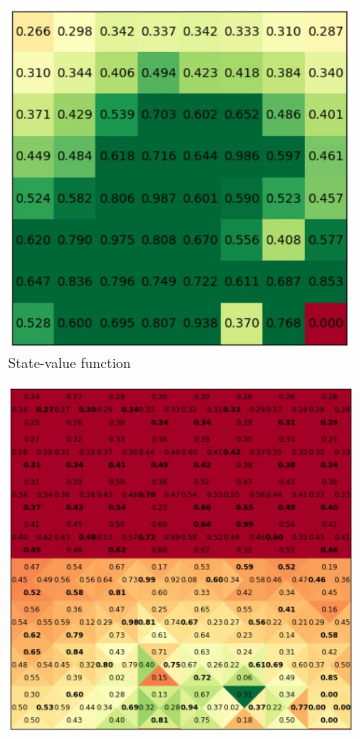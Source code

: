 \documentclass{article}
\begin{document}
\begin{enumerate}
\begin{figure}[H]
\begin{subfigure}[b]{0.5\linewidth}
		\includegraphics[width = \linewidth]{QV3.jpg}
		\caption{State-value function}
	\end{subfigure}
	\begin{subfigure}[b]{0.5\linewidth}
		\includegraphics[width = \linewidth]{QQ3.jpg}

\end{subfigure}
\end{figure}
\end{enumerate}
\end{document}
